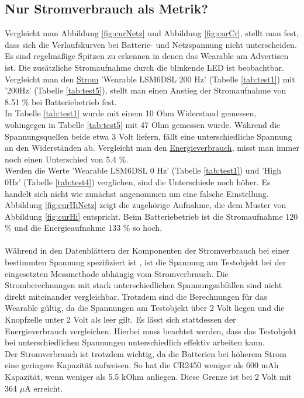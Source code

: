 \subsection{Nur Stromverbrauch als Metrik?}
Vergleicht man Abbildung \ref{fig:curNetz} und Abbildung \ref{fig:curCr}, stellt man fest, dass sich die Verlaufskurven bei Batterie- und Netzspannung nicht unterscheiden.
Es sind regelmäßige Spitzen zu erkennen in denen das Wearable am Advertisen ist.
Die zusätzliche Stromaufnahme durch die blinkende LED ist beobachtbar.\\
Vergleicht man den \underline{Strom} 'Wearable LSM6DSL 200 Hz' (Tabelle \ref{tab:test1}) mit '200Hz' (Tabelle \ref{tab:test5}), stellt man einen Anstieg der Stromaufnahme von 8.51 \% bei Batteriebetrieb fest.\\
In Tabelle \ref{tab:test1} wurde mit einem 10 Ohm Widerstand gemessen, wohingegen in Tabelle \ref{tab:test5} mit 47 Ohm gemessen wurde.
Während die Spannungsquellen beide etwa 3 Volt liefern, fällt eine unterschiedliche Spannung an den Widerständen ab.
Vergleicht man den \underline{Energieverbrauch}, misst man immer noch einen Unterschied von 5.4 \%.\\
Werden die Werte 'Wearable LSM6DSL 0 Hz' (Tabelle \ref{tab:test1}) und 'High 0Hz' (Tabelle \ref{tab:test4}) verglichen, sind die Unterschiede noch höher.
Es handelt sich nicht wie zunächst angenommen um eine falsche Einstellung.
Abbildung \ref{fig:curHiNetz} zeigt die zugehörige Aufnahme, die dem Muster von Abbildung \ref{fig:curHi} entspricht.
Beim Batteriebetrieb ist die Stromaufnahme 120 \% und die Energieaufnahme 133 \% so hoch.\\\\
Während in den Datenblättern der Komponenten der Stromverbrauch bei einer bestimmten Spannung spezifiziert ist \cite{datasheet_lsm6dsl} \cite{datasheet_nrf52832}, ist die Spannung am Testobjekt bei der eingesetzten Messmethode abhängig vom Stromverbrauch.
Die Stromberechnungen mit stark unterschiedlichen Spannungsabfällen sind nicht direkt miteinander vergleichbar.
Trotzdem sind die Berechnungen für das Wearable gültig, da die Spannungen am Testobjekt über 2 Volt liegen und die Knopfzelle unter 2 Volt als leer gilt.
Es lässt sich stattdessen der Energieverbrauch vergleichen.
Hierbei muss beachtet werden, dass das Testobjekt bei unterschiedlichen Spannungen unterschiedlich effektiv arbeiten kann.\\
Der Stromverbrauch ist trotzdem wichtig, da die Batterien bei höherem Strom eine geringere Kapazität aufweisen.
So hat die CR2450 weniger als 600 mAh Kapazität, wenn weniger als 5.5 kOhm anliegen.
Diese Grenze ist bei 2 Volt mit 364 $\mu$A erreicht. \cite{datasheet_ds6450}

